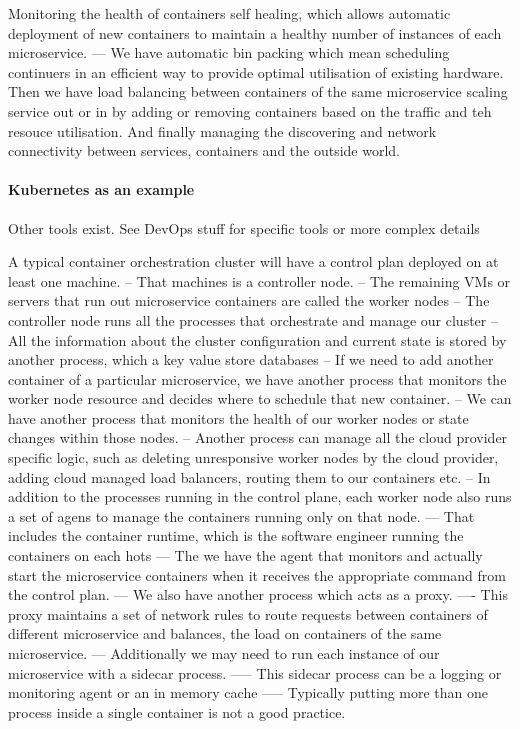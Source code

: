 \documentclass[a4paper, 11pt]{book}
\begin{document}
    Monitoring the health of containers self healing, which allows automatic deployment of new containers to maintain a healthy number of instances of each microservice.
    --- We have automatic bin packing which mean scheduling continuers in an efficient way to provide optimal utilisation of existing hardware.
    Then we have load balancing between containers of the same microservice scaling service out or in by adding or removing containers based on the traffic and teh resouce utilisation.
    And finally managing the discovering and network connectivity between services, containers and the outside world.

    \paragraph{Kubernetes as an example}
    Other tools exist. See DevOps stuff for specific tools or more complex details

    A typical container orchestration cluster will have a control plan deployed on at least one machine.
    -- That machines is a controller node.
    -- The remaining VMs or servers that run out microservice containers are called the worker nodes
    -- The controller node runs all the processes that orchestrate and manage our cluster
    -- All the information about the cluster configuration and current state is stored by another process, which a key value store databases
    -- If we need to add another container of a particular microservice, we have another process that monitors the worker node resource and decides where to schedule that new container.
    -- We can have another process that monitors the health of our worker nodes or state changes within those nodes.
    -- Another process can manage all the cloud provider specific logic, such as deleting unresponsive worker nodes by the cloud provider, adding cloud managed load balancers, routing them to our containers etc.
    -- In addition to the processes running in the control plane, each worker node also runs a set of agens to manage the containers running only on that node.
    --- That includes the container runtime, which is the software engineer running the containers on each hots
    --- The we have the agent that monitors and actually start the microservice containers when it receives the appropriate command from the control plan.
    --- We also have another process which acts as a proxy.
    ---- This proxy maintains a set of network rules to route requests between containers of different microservice and balances, the load on containers of the same microservice.
    --- Additionally we may need to run each instance of our microservice with a sidecar process.
    ----- This sidecar process can be a logging or monitoring agent or an in memory cache
    ----- Typically putting more than one process inside a single container is not a good practice.
\end{document}
